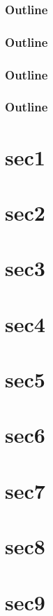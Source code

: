 \documentclass{beamer}
\begin{document}
\begin{frame}
    \frametitle{Outline}
    \tableofcontents[sections=1-4]
\end{frame}

\begin{frame}
    \frametitle{Outline}
    \tableofcontents[sections=5-9]
\end{frame}

\begin{frame}[allowframebreaks]
    \frametitle{Outline}
    \tableofcontents[sections=1-4]
    \framebreak
    \tableofcontents[sections=5-9]
\end{frame}

\begin{frame}[allowframebreaks]
    \frametitle{Outline}
    \tableofcontents
\end{frame}

\section{sec1}\frame{}
\section{sec2}\frame{}
\section{sec3}\frame{}
\section{sec4}\frame{}
\section{sec5}\frame{}
\section{sec6}\frame{}
\section{sec7}\frame{}
\section{sec8}\frame{}
\section{sec9}\frame{}
\end{document}

